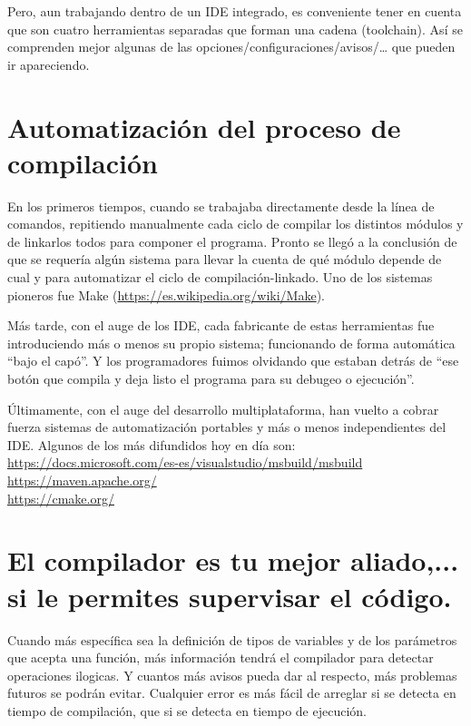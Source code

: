 \documentclass[spanish,12pt,a4paper,final,oneside]{book}
\begin{document}
Pero, aun trabajando dentro de un IDE integrado, es conveniente tener en cuenta que son cuatro herramientas separadas que forman una cadena (toolchain). Así se comprenden mejor algunas de las  opciones/configuraciones/avisos/… que pueden ir apareciendo.



\section{Automatización del proceso de compilación}
En los primeros tiempos, cuando se trabajaba directamente desde la línea de comandos, repitiendo manualmente cada ciclo de compilar los distintos módulos y de linkarlos todos para componer el programa. Pronto se llegó a la conclusión de que se requería algún sistema para llevar la cuenta de qué módulo depende de cual y para automatizar el ciclo de compilación-linkado. Uno de los sistemas pioneros fue Make (\url{https://es.wikipedia.org/wiki/Make}). 

Más tarde, con el auge de los IDE, cada fabricante de estas herramientas fue introduciendo más o menos su propio sistema; funcionando de forma automática ``bajo el capó''. Y los programadores fuimos olvidando que estaban detrás de ``ese botón que compila y deja listo el programa para su debugeo o ejecución''.

Últimamente, con el auge del desarrollo multiplataforma, han vuelto a cobrar fuerza sistemas de automatización portables y más o menos independientes del IDE. Algunos de los más difundidos hoy en día son:
\\ \url{https://docs.microsoft.com/es-es/visualstudio/msbuild/msbuild}
\\ \url{https://maven.apache.org/}
\\ \url{https://cmake.org/}



\section{El compilador es tu mejor aliado,... si le permites supervisar el código.} 
Cuando más específica sea la definición de tipos de variables y de los parámetros que acepta una función, más información tendrá el compilador para detectar operaciones ilogicas. Y cuantos más avisos pueda dar al respecto, más problemas futuros se podrán evitar. Cualquier error es más fácil de arreglar si se detecta en tiempo de compilación, que si se detecta en tiempo de ejecución.
\end{document}
